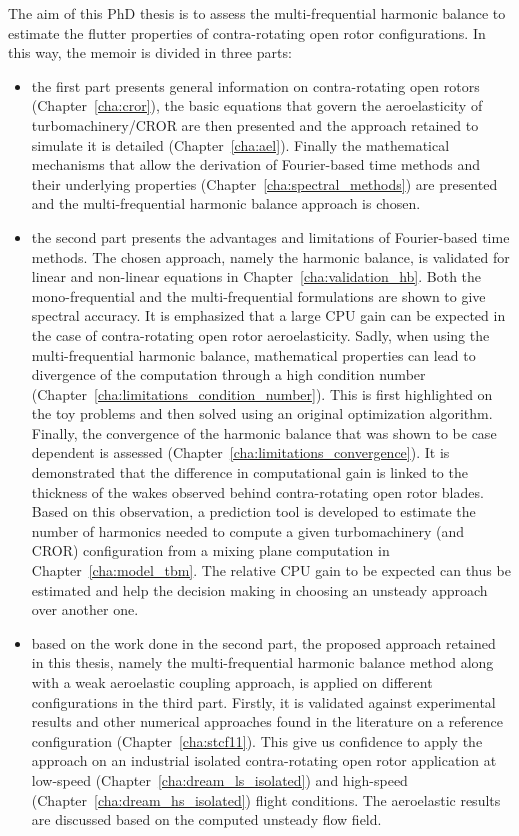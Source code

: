 The aim of this PhD thesis is to assess the
multi-frequential harmonic balance
to estimate the flutter properties of contra-rotating open rotor
configurations. In this way, the memoir is divided in three parts:
\begin{itemize}
	\item the first part presents general information on 
	contra-rotating open rotors (Chapter~\ref{cha:cror}),
	the basic equations that govern the aeroelasticity of
	turbomachinery/CROR are then presented and the approach retained 
	to simulate it is detailed (Chapter~\ref{cha:ael}).
	Finally the mathematical mechanisms that allow the derivation
	of Fourier-based time methods and their underlying properties
	(Chapter~\ref{cha:spectral_methods}) are presented and the 
	multi-frequential harmonic balance approach is chosen.
	\item the second part presents the advantages and limitations
	of Fourier-based time methods. The chosen approach, namely
	the harmonic balance, is validated for linear and non-linear
	equations in Chapter~\ref{cha:validation_hb}. Both the
	mono-frequential and the multi-frequential formulations
	are shown to give spectral accuracy.
	It is emphasized
	that a large CPU gain can be expected in the
	case of contra-rotating open rotor aeroelasticity. 
	Sadly, when using the multi-frequential harmonic
	balance, mathematical properties can lead to divergence
	of the computation through a high condition number
	(Chapter~\ref{cha:limitations_condition_number}). This is 
	first highlighted on the toy problems and then solved using
	an original optimization algorithm.
	Finally, the convergence of the harmonic balance 
	that was shown to be case dependent is
	assessed (Chapter~\ref{cha:limitations_convergence}). 
	It is demonstrated that the difference in computational
	gain is linked to the thickness of the wakes observed behind
	contra-rotating open rotor blades. Based on this observation,
	a prediction tool is developed to estimate the
	number of harmonics needed to compute a given turbomachinery (and CROR)
	configuration from a mixing plane computation in 
	Chapter~\ref{cha:model_tbm}. 
	The relative CPU gain to be expected can thus be estimated
	and help the decision making in choosing an unsteady approach
	over another one.
	\item based on the work done in the second part,
	the proposed approach retained in this thesis, 
	namely the multi-frequential harmonic balance method along with a weak 
	aeroelastic coupling approach, is applied on different configurations
	in the third part. Firstly, it is validated against experimental 
	results and other numerical approaches found in the
	literature on a reference configuration
	(Chapter~\ref{cha:stcf11}). This give us confidence
	to apply the approach on an industrial isolated contra-rotating
	open rotor application at low-speed (Chapter~\ref{cha:dream_ls_isolated})
	and high-speed (Chapter~\ref{cha:dream_hs_isolated})
	flight conditions. The aeroelastic results are discussed based
	on the computed unsteady flow field.
\end{itemize}

